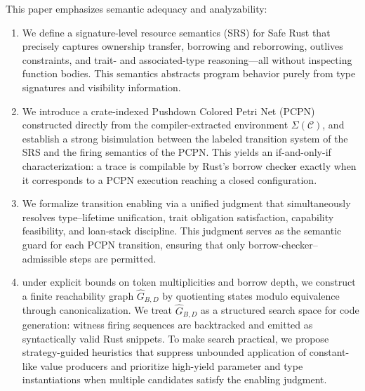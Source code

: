 \documentclass[runningheads]{llncs}
\begin{document}
This paper emphasizes semantic adequacy and analyzability:
\begin{enumerate}
  \item[1.]
  We define a signature-level resource semantics (SRS) for Safe Rust that precisely captures ownership transfer, borrowing and reborrowing, outlives constraints, and trait- and associated-type reasoning—all without inspecting function bodies. This semantics abstracts program behavior purely from type signatures and visibility information.

  \item[2.] 
  We introduce a crate-indexed Pushdown Colored Petri Net (PCPN) constructed directly from the compiler-extracted environment $\Sigma(\mathcal{C})$, and establish a strong bisimulation between the labeled transition system of the SRS and the firing semantics of the PCPN. This yields an if-and-only-if characterization: a trace is compilable by Rust’s borrow checker exactly when it corresponds to a PCPN execution reaching a closed configuration.
  
  \item[3.]
  We formalize transition enabling via a unified judgment that simultaneously resolves type–lifetime unification, trait obligation satisfaction, capability feasibility, and loan-stack discipline. This judgment serves as the semantic guard for each PCPN transition, ensuring that only borrow-checker–admissible steps are permitted.

  \item[4.] 
  under explicit bounds on token multiplicities and borrow depth, we construct a finite reachability graph $\widehat{G}_{B,D}$ by quotienting states modulo equivalence through canonicalization. We treat $\widehat{G}_{B,D}$ as a structured search space for code generation: witness firing sequences are backtracked and emitted as syntactically valid Rust snippets. To make search practical, we propose strategy-guided heuristics that suppress unbounded application of constant-like value producers and prioritize high-yield parameter and type instantiations when multiple candidates satisfy the enabling judgment.
\end{enumerate}
\end{document}
